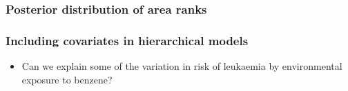 \documentclass{beamer}
\newcommand{\I}{\item}
\newcommand{\bibig}{\begin{itemize}}
\newcommand{\eibig}{\end{itemize}}
\begin{document}
\begin{frame}
\frametitle{Posterior distribution of area ranks}
\centerline{}
\end{frame}

\begin{frame}
\frametitle{Including covariates in hierarchical models}
\vspace{-12mm}
\hspace{-15mm}
\vspace{-15mm}
\bibig
\I Can we explain some of the variation in risk of leukaemia by environmental exposure to benzene?
\eibig
\end{frame}
\end{document}
